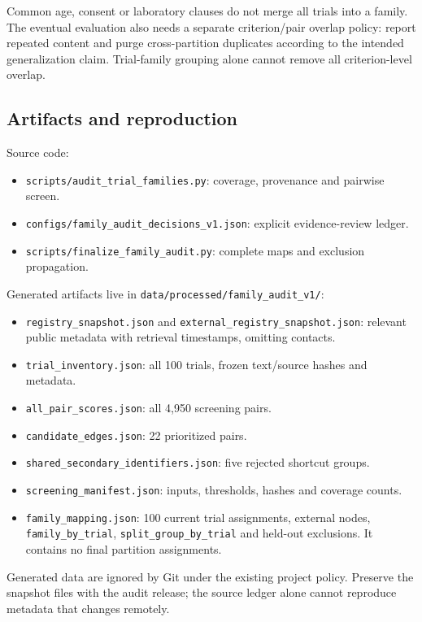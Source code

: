 \documentclass[10pt,letterpaper]{article}
\newcommand{\pathcode}[1]{\nolinkurl{#1}}
\begin{document}
Common age, consent or laboratory clauses do not merge all trials into a family. The eventual evaluation also needs a separate criterion/pair overlap policy: report repeated content and purge cross-partition duplicates according to the intended generalization claim. Trial-family grouping alone cannot remove all criterion-level overlap.

\subsection{Artifacts and reproduction}\label{audit-artifacts-and-reproduction}

Source code:

\begin{itemize}
\item
  \pathcode{scripts/audit_trial_families.py}: coverage, provenance and pairwise screen.
\item
  \pathcode{configs/family_audit_decisions_v1.json}: explicit evidence-review ledger.
\item
  \pathcode{scripts/finalize_family_audit.py}: complete maps and exclusion propagation.
\end{itemize}

Generated artifacts live in \pathcode{data/processed/family_audit_v1/}:

\begin{itemize}
\item
  \pathcode{registry_snapshot.json} and \pathcode{external_registry_snapshot.json}: relevant public metadata with retrieval timestamps, omitting contacts.
\item
  \pathcode{trial_inventory.json}: all 100 trials, frozen text/source hashes and metadata.
\item
  \pathcode{all_pair_scores.json}: all 4,950 screening pairs.
\item
  \pathcode{candidate_edges.json}: 22 prioritized pairs.
\item
  \pathcode{shared_secondary_identifiers.json}: five rejected shortcut groups.
\item
  \pathcode{screening_manifest.json}: inputs, thresholds, hashes and coverage counts.
\item
  \pathcode{family_mapping.json}: 100 current trial assignments, external nodes, \pathcode{family_by_trial}, \pathcode{split_group_by_trial} and held-out exclusions. It contains no final partition assignments.
\end{itemize}

Generated data are ignored by Git under the existing project policy. Preserve the snapshot files with the audit release; the source ledger alone cannot reproduce metadata that changes remotely.
\end{document}
